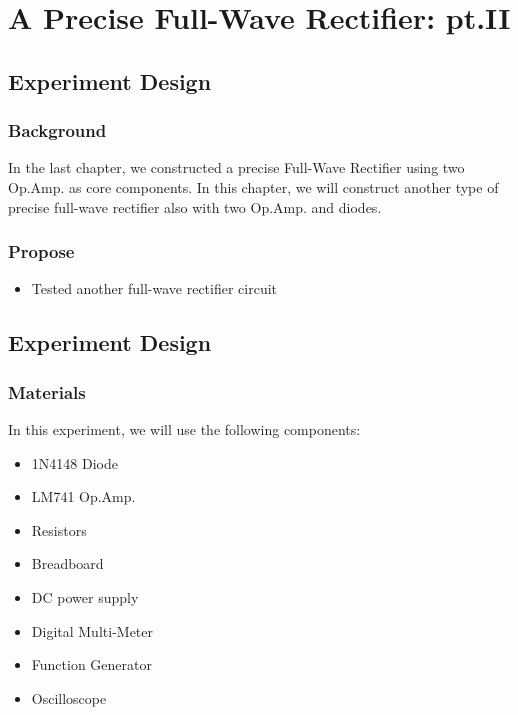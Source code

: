 \section{A Precise Full-Wave Rectifier: pt.II}

\subsection{Experiment Design}
    \subsubsection{Background}
        In the last chapter, we constructed a precise Full-Wave Rectifier using two Op.Amp. as core components. In this chapter, we will construct another type of precise full-wave rectifier also with two Op.Amp. and diodes.\par

    \subsubsection{Propose}
    \begin{itemize}
        \item Tested another full-wave rectifier circuit
    \end{itemize}

\subsection{Experiment Design}
    \subsubsection{Materials}
        In this experiment, we will use the following components:
        \begin{itemize}
            \item 1N4148 Diode
            \item LM741 Op.Amp.
            \item Resistors
            \item Breadboard
            \item DC power supply
            \item Digital Multi-Meter
            \item Function Generator
            \item Oscilloscope
        \end{itemize}

